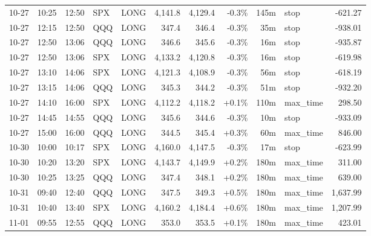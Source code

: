 \documentclass[11pt,a4paper,twoside]{article}
\begin{document}
\begin{center}
\begin{longtable}{>{\color{txtmain}}l l l l l r r r r >{\color{txtmain}}l r}
10-27 & 10:25 & 12:50 & SPX & LONG & 4,141.8 & 4,129.4 & \textcolor{lossred}{-0.3\%} & 145m & stop & \textcolor{lossred}{-621.27} \\
10-27 & 12:15 & 12:50 & QQQ & LONG & 347.4 & 346.4 & \textcolor{lossred}{-0.3\%} & 35m & stop & \textcolor{lossred}{-938.01} \\
10-27 & 12:50 & 13:06 & QQQ & LONG & 346.6 & 345.6 & \textcolor{lossred}{-0.3\%} & 16m & stop & \textcolor{lossred}{-935.87} \\
10-27 & 12:50 & 13:06 & SPX & LONG & 4,133.2 & 4,120.8 & \textcolor{lossred}{-0.3\%} & 16m & stop & \textcolor{lossred}{-619.98} \\
10-27 & 13:10 & 14:06 & SPX & LONG & 4,121.3 & 4,108.9 & \textcolor{lossred}{-0.3\%} & 56m & stop & \textcolor{lossred}{-618.19} \\
10-27 & 13:15 & 14:06 & QQQ & LONG & 345.3 & 344.2 & \textcolor{lossred}{-0.3\%} & 51m & stop & \textcolor{lossred}{-932.20} \\
10-27 & 14:10 & 16:00 & SPX & LONG & 4,112.2 & 4,118.2 & \textcolor{wingreen}{+0.1\%} & 110m & max\_time & \textcolor{wingreen}{298.50} \\
10-27 & 14:45 & 14:55 & QQQ & LONG & 345.6 & 344.6 & \textcolor{lossred}{-0.3\%} & 10m & stop & \textcolor{lossred}{-933.09} \\
10-27 & 15:00 & 16:00 & QQQ & LONG & 344.5 & 345.4 & \textcolor{wingreen}{+0.3\%} & 60m & max\_time & \textcolor{wingreen}{846.00} \\
10-30 & 10:00 & 10:17 & SPX & LONG & 4,160.0 & 4,147.5 & \textcolor{lossred}{-0.3\%} & 17m & stop & \textcolor{lossred}{-623.99} \\
10-30 & 10:20 & 13:20 & SPX & LONG & 4,143.7 & 4,149.9 & \textcolor{wingreen}{+0.2\%} & 180m & max\_time & \textcolor{wingreen}{311.00} \\
10-30 & 10:25 & 13:25 & QQQ & LONG & 347.4 & 348.1 & \textcolor{wingreen}{+0.2\%} & 180m & max\_time & \textcolor{wingreen}{639.00} \\
10-31 & 09:40 & 12:40 & QQQ & LONG & 347.5 & 349.3 & \textcolor{wingreen}{+0.5\%} & 180m & max\_time & \textcolor{wingreen}{1,637.99} \\
10-31 & 10:40 & 13:40 & SPX & LONG & 4,160.2 & 4,184.4 & \textcolor{wingreen}{+0.6\%} & 180m & max\_time & \textcolor{wingreen}{1,207.99} \\
11-01 & 09:55 & 12:55 & QQQ & LONG & 353.0 & 353.5 & \textcolor{wingreen}{+0.1\%} & 180m & max\_time & \textcolor{wingreen}{423.01} \\

\end{longtable}
\end{center}
\end{document}
